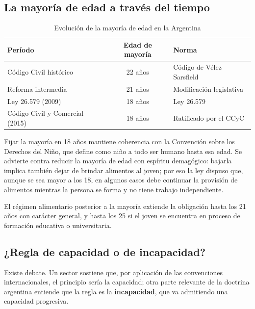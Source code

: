 \documentclass[12pt,oneside]{book}
\begin{document}
\subsection{La mayoría de edad a través del tiempo}

\begin{table}[H]
\centering
\begin{tabularx}{\textwidth}{Y c Y}
\toprule
\textbf{Período} & \textbf{Edad de mayoría} & \textbf{Norma} \\
\midrule
Código Civil histórico & 22 años & Código de Vélez Sarsfield \\
Reforma intermedia & 21 años & Modificación legislativa \\
Ley 26.579 (2009) & 18 años & Ley 26.579 \\
Código Civil y Comercial (2015) & 18 años & Ratificado por el CCyC \\
\bottomrule
\end{tabularx}
\caption{Evolución de la mayoría de edad en la Argentina}
\end{table}

Fijar la mayoría en 18 años mantiene coherencia con la Convención sobre los Derechos del Niño, que define como niño a todo ser humano hasta esa edad. Se advierte contra reducir la mayoría de edad con espíritu demagógico: bajarla implica también dejar de brindar alimentos al joven; por eso la ley dispuso que, aunque se sea mayor a los 18, en algunos casos debe continuar la provisión de alimentos mientras la persona se forma y no tiene trabajo independiente.

\begin{nota}
El régimen alimentario posterior a la mayoría extiende la obligación hasta los 21 años con carácter general, y hasta los 25 si el joven se encuentra en proceso de formación educativa o universitaria.
\end{nota}

\subsection{¿Regla de capacidad o de incapacidad?}

Existe debate. Un sector sostiene que, por aplicación de las convenciones internacionales, el principio sería la capacidad; otra parte relevante de la doctrina argentina entiende que la regla es la \textbf{incapacidad}, que va admitiendo una capacidad progresiva.
\end{document}
